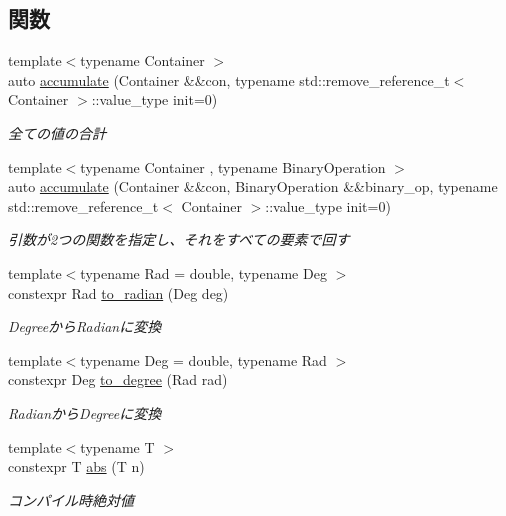 \subsection*{関数}
\begin{DoxyCompactItemize}
\item 
{\footnotesize template$<$typename Container $>$ }\\auto \mbox{\hyperlink{namespacesaki_a981cc67b0d421b1836678c3ac4069afd}{accumulate}} (Container \&\&con, typename std\+::remove\+\_\+reference\+\_\+t$<$ Container $>$\+::value\+\_\+type init=0)
\begin{DoxyCompactList}\small\item\em 全ての値の合計 \end{DoxyCompactList}\item 
{\footnotesize template$<$typename Container , typename Binary\+Operation $>$ }\\auto \mbox{\hyperlink{namespacesaki_acb8c3f650d3b5d3b06259b91bd7ad85d}{accumulate}} (Container \&\&con, Binary\+Operation \&\&binary\+\_\+op, typename std\+::remove\+\_\+reference\+\_\+t$<$ Container $>$\+::value\+\_\+type init=0)
\begin{DoxyCompactList}\small\item\em 引数が2つの関数を指定し、それをすべての要素で回す \end{DoxyCompactList}\item 
{\footnotesize template$<$typename Rad  = double, typename Deg $>$ }\\constexpr Rad \mbox{\hyperlink{namespacesaki_aae246ec576e9e2da23c0c142e6fc4d6a}{to\+\_\+radian}} (Deg deg)
\begin{DoxyCompactList}\small\item\em Degreeから\+Radianに変換 \end{DoxyCompactList}\item 
{\footnotesize template$<$typename Deg  = double, typename Rad $>$ }\\constexpr Deg \mbox{\hyperlink{namespacesaki_aa28ebe642bd2c0e608e2a61c34b3d7a5}{to\+\_\+degree}} (Rad rad)
\begin{DoxyCompactList}\small\item\em Radianから\+Degreeに変換 \end{DoxyCompactList}\item 
{\footnotesize template$<$typename T $>$ }\\constexpr T \mbox{\hyperlink{namespacesaki_a012046e05c5909bb34ca3e609ca74ff3}{abs}} (T n)
\begin{DoxyCompactList}\small\item\em コンパイル時絶対値 \end{DoxyCompactList}\item 

\end{DoxyCompactItemize}
